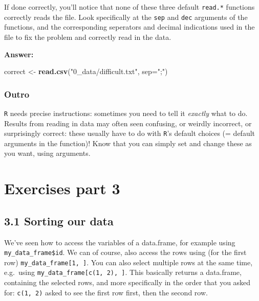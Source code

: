 \documentclass[]{article}
\newenvironment{Shaded}{\begin{snugshade}}{\end{snugshade}}
\newcommand{\DataTypeTok}[1]{\textcolor[rgb]{0.13,0.29,0.53}{#1}}
\newcommand{\KeywordTok}[1]{\textcolor[rgb]{0.13,0.29,0.53}{\textbf{#1}}}
\newcommand{\NormalTok}[1]{#1}
\newcommand{\StringTok}[1]{\textcolor[rgb]{0.31,0.60,0.02}{#1}}
\begin{document}
If done correctly, you'll notice that none of these three default
\texttt{read.*} functions correctly reads the file. Look specifically at
the \texttt{sep} and \texttt{dec} arguments of the functions, and the
corresponding seperators and decimal indications used in the file to fix
the problem and correctly read in the data.

\textbf{Answer:}

\begin{Shaded}
\begin{Highlighting}[]
\NormalTok{correct <-}\StringTok{ }\KeywordTok{read.csv}\NormalTok{(}\StringTok{"0_data/difficult.txt"}\NormalTok{, }\DataTypeTok{sep=}\StringTok{";"}\NormalTok{)}
\end{Highlighting}
\end{Shaded}

\hypertarget{outro-2}{%
\subsubsection{Outro}\label{outro-2}}

\texttt{R} needs precise instructions: sometimes you need to tell it
\emph{exactly} what to do. Results from reading in data may often seen
confusing, or weirdly incorrect, or surprisingly correct: these usually
have to do with \texttt{R}'s default choices (= default arguments in the
function)! Know that you can simply set and change these as you want,
using arguments.

\newpage

\hypertarget{exercises-part-3}{%
\section{Exercises part 3}\label{exercises-part-3}}

\hypertarget{sorting-our-data}{%
\subsection{3.1 Sorting our data}\label{sorting-our-data}}

We've seen how to access the variables of a data.frame, for example
using \texttt{my\_data\_frame\$id}. We can of course, also access the
rows using (for the first row) \texttt{my\_data\_frame{[}1,\ {]}}. You
can also select multiple rows at the same time, e.g.~using
\texttt{my\_data\_frame{[}c(1,\ 2),\ {]}}. This basically returns a
data.frame, containing the selected rows, and more specifically in the
order that you asked for: \texttt{c(1,\ 2)} asked to see the first row
first, then the second row.
\end{document}
